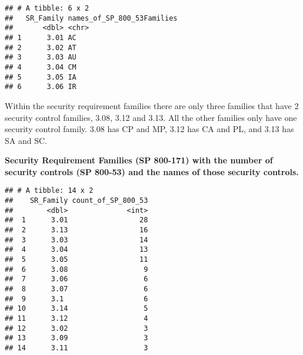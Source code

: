 \documentclass[]{article}
\newenvironment{Shaded}{\begin{snugshade}}{\end{snugshade}}
\newcommand{\KeywordTok}[1]{\textcolor[rgb]{0.13,0.29,0.53}{\textbf{#1}}}
\newcommand{\DataTypeTok}[1]{\textcolor[rgb]{0.13,0.29,0.53}{#1}}
\newcommand{\DecValTok}[1]{\textcolor[rgb]{0.00,0.00,0.81}{#1}}
\newcommand{\StringTok}[1]{\textcolor[rgb]{0.31,0.60,0.02}{#1}}
\newcommand{\OperatorTok}[1]{\textcolor[rgb]{0.81,0.36,0.00}{\textbf{#1}}}
\newcommand{\NormalTok}[1]{#1}
\begin{document}
\begin{verbatim}
## # A tibble: 6 x 2
##   SR_Family names_of_SP_800_53Families
##       <dbl> <chr>                     
## 1      3.01 AC                        
## 2      3.02 AT                        
## 3      3.03 AU                        
## 4      3.04 CM                        
## 5      3.05 IA                        
## 6      3.06 IR
\end{verbatim}

Within the security requirement families there are only three families
that have 2 security control families, 3.08, 3.12 and 3.13. All the
other families only have one security control family. 3.08 has CP and
MP, 3.12 has CA and PL, and 3.13 has SA and SC.

\textbf{Security Requirement Families (SP 800-171) with the number of
security controls (SP 800-53) and the names of those security controls.}

\begin{Shaded}
\end{Shaded}

\begin{verbatim}
## # A tibble: 14 x 2
##    SR_Family count_of_SP_800_53
##        <dbl>              <int>
##  1      3.01                 28
##  2      3.13                 16
##  3      3.03                 14
##  4      3.04                 13
##  5      3.05                 11
##  6      3.08                  9
##  7      3.06                  6
##  8      3.07                  6
##  9      3.1                   6
## 10      3.14                  5
## 11      3.12                  4
## 12      3.02                  3
## 13      3.09                  3
## 14      3.11                  3
\end{verbatim}

\begin{Shaded}
\end{Shaded}
\end{document}
